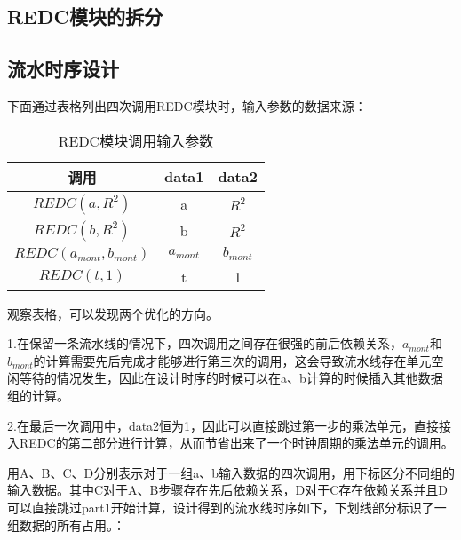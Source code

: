 \documentclass[UTF8]{ctexart}
\begin{document}
	\subsection{REDC模块的拆分}
	\subsection{流水时序设计}
	下面通过表格列出四次调用REDC模块时，输入参数的数据来源：
	\begin{table}[h!]
		\begin{center}
			\caption{REDC模块调用输入参数}
			\setlength{\tabcolsep}{6pt}
			\begin{tabular}{c c c}
\toprule
		\textbf{调用} & \textbf{data1} & \textbf{data2} \\
		\midrule
		$REDC(a,R^2)$   &  a & $R^2$  \\
		$REDC(b,R^2)$   &  b & $R^2$  \\
		$REDC(a_{mont},b_{mont})$   &  $a_{mont} $& $b_{mont}$  \\
		$REDC(t,1) $  & t          & 1  \\
		\bottomrule
			\end{tabular}
		\end{center}
	\end{table}
	观察表格，可以发现两个优化的方向。
	\par 1.在保留一条流水线的情况下，四次调用之间存在很强的前后依赖关系，$a_{mont}$和$b_{mont}$的计算需要先后完成才能够进行第三次的调用，这会导致流水线存在单元空闲等待的情况发生，因此在设计时序的时候可以在a、b计算的时候插入其他数据组的计算。
	\par 2.在最后一次调用中，data2恒为1，因此可以直接跳过第一步的乘法单元，直接接入REDC的第二部分进行计算，从而节省出来了一个时钟周期的乘法单元的调用。
	\par 用A、B、C、D分别表示对于一组a、b输入数据的四次调用，用下标区分不同组的输入数据。其中C对于A、B步骤存在先后依赖关系，D对于C存在依赖关系并且D可以直接跳过part1开始计算，设计得到的流水线时序如下，下划线部分标识了一组数据的所有占用。：
\end{document}
